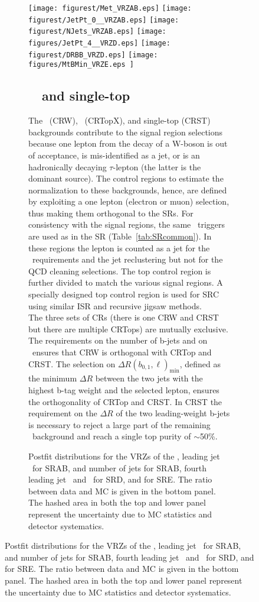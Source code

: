 \begin{figure}[htbp]
\begin{center}
\begin{figure}[htbp]
  \begin{center}
    \texttt{[image: figurest/Met\_VRZAB.eps]}
     \texttt{[image: figurest/JetPt\_0\_\_VRZAB.eps]}
     \texttt{[image: figurest/NJets\_VRZAB.eps]}
   \texttt{[image: figures/JetPt\_4\_\_VRZD.eps]}
    \texttt{[image: figurest/DRBB\_VRZD.eps]}
    \texttt{[image: figures/MtBMin\_VRZE.eps ]}
    \caption{\label{fig:VRZ} Postfit distributions for the VRZs of the \met, leading jet \pt\ for SRAB, and number of jets for SRAB, fourth leading jet \pt\ and \drbb\ for SRD, and \mtbmin for SRE. The ratio between data and MC is given in the bottom panel. The hashed area in both the top and lower panel represent the uncertainty due to MC statistics and detector systematics.}

\subsection{\ttbar\, \Wjets\, and single-top}
\label{sec:1leptonCR}

The \Wjets\ (CRW), \ttbar\ (CRTopX), and single-top (CRST)  backgrounds contribute to the signal region selections because one lepton from the decay of a W-boson is out of acceptance, is mis-identified as a jet, or is an hadronically decaying $\tau$-lepton (the latter is the dominant source). The control regions to estimate the normalization to these backgrounds, hence, are defined by exploiting a one lepton (electron or muon) selection, thus making them orthogonal to the SRs. For consistency with the signal regions, the same \met\ triggers are used as in the SR (Table~\ref{tab:SRcommon}). In these regions the lepton is counted as a jet for the \pt\ requirements and the jet reclustering but not for the QCD cleaning selections. The top control region is further divided to match the various signal regions. A specially designed top control region is used for SRC using similar ISR and recursive jigsaw methods. \\


The three sets of CRs (there is one CRW and CRST but there are multiple CRTops) are mutually exclusive. The requirements on the number of b-jets and on \mantikttwelvezero\ ensures that CRW is orthogonal with CRTop and CRST. The selection on $\Delta R(b_{0,1},\ell)_{\mathrm{min}}$, defined as the minimum $\Delta R$ between the two jets with the highest b-tag weight and the selected lepton, ensures the orthogonality of CRTop and CRST. In CRST the requirement on the $\Delta R$ of the two leading-weight b-jets is necessary to reject a large part of the remaining \ttbar\ background and reach a single top purity of $\sim$50\%.\\


\end{center}
\end{figure}
\end{center}
\end{figure}
